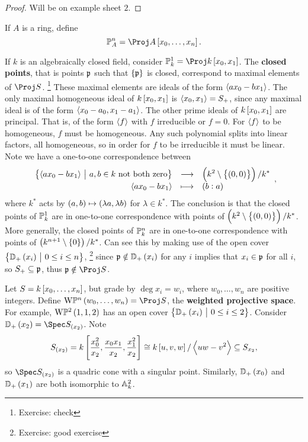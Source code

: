 \begin{proof}
Will be on example sheet $ 2 $.
\end{proof}

\begin{definition*}
If $ A $ is a ring, define
$$ \PP_A^n = \Proj A\sbr{x_0, \dots, x_n}. $$
\end{definition*}

\begin{example*}
If $ k $ is an algebraically closed field, consider $ \PP_k^1 = \Proj k\sbr{x_0, x_1} $. The \textbf{closed points}, that is points $ \ppp $ such that $ \cbr{\ppp} $ is closed, correspond to maximal elements of $ \Proj S $. \footnote{Exercise: check} These maximal elements are ideals of the form $ \abr{ax_0 - bx_1} $. The only maximal homogeneous ideal of $ k\sbr{x_0, x_1} $ is $ \abr{x_0, x_1} = S_+ $, since any maximal ideal is of the form $ \abr{x_0 - a_0, x_1 - a_1} $. The other prime ideals of $ k\sbr{x_0, x_1} $ are principal. That is, of the form $ \abr{f} $ with $ f $ irreducible or $ f = 0 $. For $ \abr{f} $ to be homogeneous, $ f $ must be homogeneous. Any such polynomial splits into linear factors, all homogeneous, so in order for $ f $ to be irreducible it must be linear. Note we have a one-to-one correspondence between
$$ \function{\cbr{\abr{ax_0 - bx_1} \st a, b \in k \ \text{not both zero}}}{\br{k^2 \setminus \cbr{\br{0, 0}}} / k^*}{\abr{ax_0 - bx_1}}{\br{b : a}}, $$
where $ k^* $ acts by $ \br{a, b} \mapsto \br{\lambda a, \lambda b} $ for $ \lambda \in k^* $. The conclusion is that the closed points of $ \PP_k^1 $ are in one-to-one correspondence with points of $ \br{k^2 \setminus \cbr{\br{0, 0}}} / k^* $. More generally, the closed points of $ \PP_k^n $ are in one-to-one correspondence with points of $ \br{k^{n + 1} \setminus \cbr{0}} / k^* $. Can see this by making use of the open cover $ \cbr{\DD_+\br{x_i} \st 0 \le i \le n} $, \footnote{Exercise: good exercise} since $ \ppp \notin \DD_+\br{x_i} $ for any $ i $ implies that $ x_i \in \ppp $ for all $ i $, so $ S_+ \subseteq \ppp $, thus $ \ppp \notin \Proj S $.
\end{example*}

\begin{example*}
Let $ S = k\sbr{x_0, \dots, x_n} $, but grade by $ \deg x_i = w_i $, where $ w_0, \dots, w_n $ are positive integers. Define $ \W\PP^n\br{w_0, \dots, w_n} = \Proj S $, the \textbf{weighted projective space}. For example, $ \W\PP^2\br{1, 1, 2} $ has an open cover $ \cbr{\DD_+\br{x_i} \st 0 \le i \le 2} $. Consider $ \DD_+\br{x_2} = \Spec S_{\br{x_2}} $. Note
$$ S_{\br{x_2}} = k\sbr{\dfrac{x_0^2}{x_2}, \dfrac{x_0x_1}{x_2}, \dfrac{x_1^2}{x_2}} \cong k\sbr{u, v, w} / \abr{uw - v^2} \subseteq S_{x_2}, $$
so $ \Spec S_{\br{x_2}} $ is a quadric cone with a singular point. Similarly, $ \DD_+\br{x_0} $ and $ \DD_+\br{x_1} $ are both isomorphic to $ \AA_k^2 $.
\end{example*}

